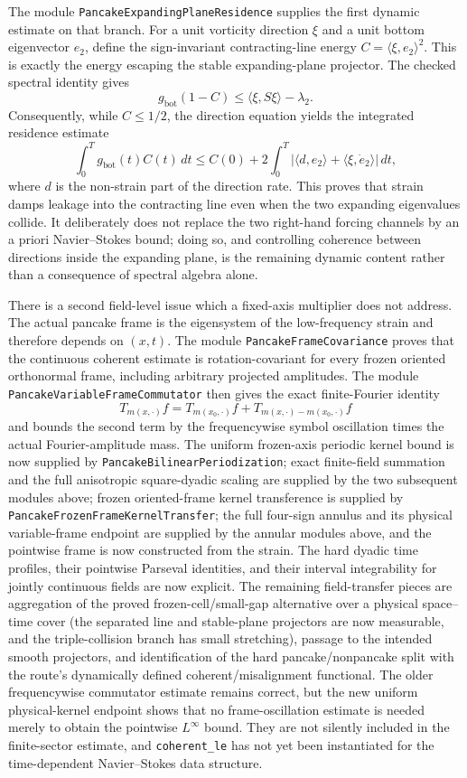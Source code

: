 \documentclass[11pt]{article}
\theoremstyle{definition}
\begin{document}
The module \texttt{PancakeExpandingPlaneResidence} supplies the first dynamic
estimate on that branch.  For a unit vorticity direction $\xi$ and a unit
bottom eigenvector $e_2$, define the sign-invariant contracting-line energy
$C=\langle\xi,e_2\rangle^2$.  This is exactly the energy escaping the stable
expanding-plane projector.  The checked spectral identity gives
\[
 g_{\mathrm{bot}}(1-C)
 \leq \langle\xi,S\xi\rangle-\lambda_2 .
\]
Consequently, while $C\leq1/2$, the direction equation yields the integrated
residence estimate
\[
 \int_0^T g_{\mathrm{bot}}(t)C(t)\,dt
 \leq C(0)+2\int_0^T
 \left|\langle d,e_2\rangle+\langle\xi,\dot e_2\rangle\right|\,dt,
\]
where $d$ is the non-strain part of the direction rate.  This proves that
strain damps leakage into the contracting line even when the two expanding
eigenvalues collide.  It deliberately does not replace the two right-hand
forcing channels by an a priori Navier--Stokes bound; doing so, and controlling
coherence between directions inside the expanding plane, is the remaining
dynamic content rather than a consequence of spectral algebra alone.

There is a second field-level issue which a fixed-axis multiplier does not
address.  The actual pancake frame is the eigensystem of the low-frequency
strain and therefore depends on $(x,t)$.  The module
\texttt{PancakeFrameCovariance} proves that the continuous coherent estimate is
rotation-covariant for every frozen oriented orthonormal frame, including
arbitrary projected amplitudes.  The module
\texttt{PancakeVariableFrameCommutator} then gives the exact finite-Fourier
identity
\[
 T_{m(x,\cdot)}f=T_{m(x_0,\cdot)}f+
 T_{m(x,\cdot)-m(x_0,\cdot)}f
\]
and bounds the second term by the frequencywise symbol oscillation times the
actual Fourier-amplitude mass.  The uniform frozen-axis periodic kernel bound
is now supplied by \texttt{PancakeBilinearPeriodization}; exact finite-field
summation and the full anisotropic square-dyadic scaling are supplied by the
two subsequent modules above; frozen oriented-frame kernel transference is
supplied by \texttt{PancakeFrozenFrameKernelTransfer}; the full four-sign
annulus and its physical variable-frame endpoint are supplied by the annular
modules above, and the pointwise frame is now constructed from the strain.
The hard dyadic time profiles, their pointwise Parseval identities, and their
interval integrability for jointly continuous fields are now explicit.  The
remaining field-transfer pieces are aggregation of the proved
frozen-cell/small-gap alternative over a physical space--time cover (the
separated line and stable-plane projectors are now measurable, and the
triple-collision branch has small stretching), passage
to the intended smooth projectors, and identification of the hard
pancake/nonpancake split with the route's dynamically defined
coherent/misalignment functional.
The older frequencywise commutator estimate
remains correct, but the new uniform physical-kernel endpoint shows that no
frame-oscillation estimate is needed merely to obtain the pointwise
$L^\infty$ bound.
They are not silently included in the finite-sector estimate, and
\texttt{coherent\_le} has not yet been instantiated for the time-dependent
Navier--Stokes data structure.
\end{document}
